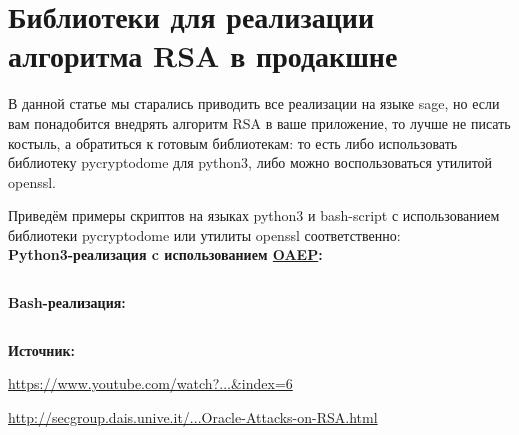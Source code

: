 \documentclass[12pt,a4paper]{scrartcl}
\begin{document}
\section{Библиотеки для реализации алгоритма RSA в продакшне}

В данной статье мы старались приводить все реализации на языке sage, но если вам понадобится внедрять алгоритм RSA в ваше приложение, то лучше не писать костыль, а обратиться к готовым библиотекам: то есть либо использовать библиотеку pycryptodome для python3, либо можно воспользоваться утилитой openssl.

Приведём примеры скриптов на языках python3 и bash-script с использованием библиотеки pycryptodome или утилиты openssl соответственно:\\

\textbf{Python3-реализация c использованием \href{https://yatb.kksctf.ru/}{OAEP}:}\\

\inputminted[tabsize=4,obeytabs,fontsize=\footnotesize]{python3}{./RSA_scripts/example_pycrypto.py}

\textbf{Bash-реализация:}\\

\inputminted[tabsize=4,obeytabs,fontsize=\footnotesize]{python3}{./RSA_scripts/openssl.sh}

\textbf{Источник:}

\href{https://www.youtube.com/watch?v=ibfb7\_-\_CGg\&list=PLLguubeCGWoaGFEDzduGmBhEgZ62p-Jqv\&index=6}{https://www.youtube.com/watch?...\&index=6}

\href{http://secgroup.dais.unive.it/wp-content/uploads/2012/11/Practical-Padding-Oracle-Attacks-on-RSA.html}{http://secgroup.dais.unive.it/...Oracle-Attacks-on-RSA.html}
\end{document}
